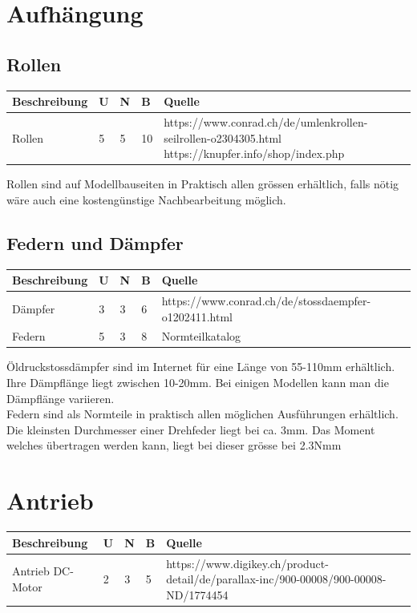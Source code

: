 \documentclass[a4paper]{report}
\begin{document}
\section{Aufhängung}
\label{app:sec:Aufhang}
\subsection{Rollen}
\label{app:ssec:Rollen}
\begin{tabular}{|p{}|p{}|p{}|p{}|p{}|}
	\hline
	\textbf{Beschreibung} & \textbf{U} & \textbf{N} & \textbf{B} & \textbf{Quelle} \\
	\hline
	Rollen &5 &5 &10 & https://www.conrad.ch/de/umlenkrollen-seilrollen-o2304305.html
	\newline https://knupfer.info/shop/index.php \\
	\hline
\end{tabular}


Rollen sind auf Modellbauseiten in Praktisch allen grössen erhältlich, falls nötig wäre auch eine kostengünstige Nachbearbeitung möglich.
\subsection{Federn und Dämpfer}
	\begin{tabular}{|p{}|p{}|p{}|p{}|p{}|}
	\hline
	\textbf{Beschreibung} & \textbf{U} & \textbf{N} & \textbf{B} & \textbf{Quelle} \\
	\hline
	Dämpfer &3 &3 &6 & https://www.conrad.ch/de/stossdaempfer-o1202411.html \\
	\hline
	Federn &5 &3 &8 & Normteilkatalog\\
	\hline
\end{tabular}


Öldruckstossdämpfer sind im Internet für eine Länge von 55-110mm erhältlich. Ihre Dämpflänge liegt zwischen 10-20mm. Bei einigen Modellen kann man die Dämpflänge variieren. \\
Federn sind als Normteile in praktisch allen möglichen Ausführungen erhältlich. Die kleinsten Durchmesser einer Drehfeder liegt bei ca. 3mm. Das Moment welches übertragen werden kann, liegt bei dieser grösse bei 2.3Nmm

\section{Antrieb}
\label{app:sec:Antrieb}
\begin{tabular}{|p{}|p{}|p{}|p{}|p{}|}
	\hline
	\textbf{Beschreibung} & \textbf{U} & \textbf{N} & \textbf{B} & \textbf{Quelle} \\
	\hline
	Antrieb DC-Motor & 2 & 3 & 5 & https://www.digikey.ch/product-detail/de/parallax-inc/900-00008/900-00008-ND/1774454 \\
	\hline
\end{tabular}
\end{document}
